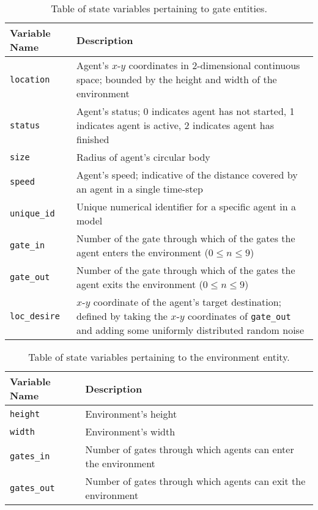 \begin{table}
    \centering
    \begin{tabularx}{\textwidth}{lX}
        \toprule
        Variable Name & Description \\
        \midrule
        \texttt{location} & Agent's $x$-$y$ coordinates in 2-dimensional
                            continuous space; bounded by the height and width of
                            the environment \\
        \texttt{status} & Agent's status; 0 indicates agent has not started, 1
                          indicates agent is active, 2 indicates agent has
                          finished \\
        \texttt{size} & Radius of agent's circular body \\
        \texttt{speed} & Agent's speed; indicative of the distance covered by an
                         agent in a single time-step \\
        \texttt{unique\_id} & Unique numerical identifier for a specific agent
                              in a model \\
        \texttt{gate\_in} & Number of the gate through which of the gates the
                            agent enters the environment ($0 \leq n \leq 9$) \\
        \texttt{gate\_out} & Number of the gate through which of the gates the
                             agent exits the environment ($0 \leq n \leq 9$) \\
        \texttt{loc\_desire} & $x$-$y$ coordinate of the agent's target
                               destination; defined by taking the $x$-$y$
                               coordinates of \texttt{gate\_out} and adding some
                               uniformly distributed random noise \\
        \bottomrule
    \end{tabularx}
    \caption{Table of state variables pertaining to gate entities.}
    \label{tab:agent_variables}
\end{table}

\begin{table}
    \centering
    \begin{tabularx}{\textwidth}{lX}
        \toprule
        Variable Name & Description \\
        \midrule
        \texttt{height} & Environment's height \\
        \texttt{width} & Environment's width \\
        \texttt{gates\_in} & Number of gates through which agents can enter the
                             environment \\
        \texttt{gates\_out} & Number of gates through which agents can exit the
                              environment \\
        \bottomrule
    \end{tabularx}
    \caption{Table of state variables pertaining to the environment entity.}
    \label{tab:environment_variables}
\end{table}

